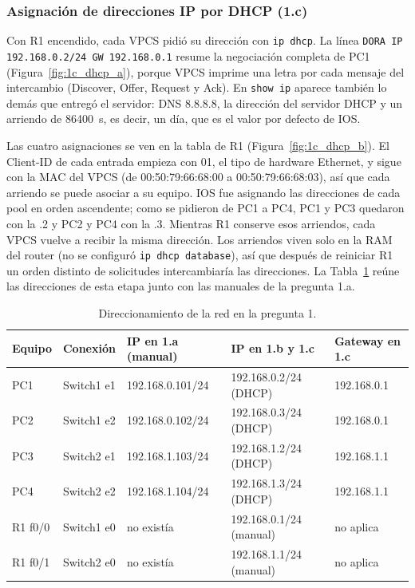 \documentclass[11pt]{article}
\begin{document}
\subsubsection{Asignación de direcciones IP por DHCP (1.c)}

Con R1 encendido, cada VPCS pidió su dirección con \texttt{ip dhcp}. La línea \texttt{DORA IP 192.168.0.2/24 GW 192.168.0.1} resume la negociación completa de PC1 (Figura~\ref{fig:1c_dhcp_a}), porque VPCS imprime una letra por cada mensaje del intercambio (Discover, Offer, Request y Ack). En \texttt{show ip} aparece también lo demás que entregó el servidor: DNS 8.8.8.8, la dirección del servidor DHCP y un arriendo de 86400~s, es decir, un día, que es el valor por defecto de IOS.

Las cuatro asignaciones se ven en la tabla de R1 (Figura~\ref{fig:1c_dhcp_b}). El Client-ID de cada entrada empieza con 01, el tipo de hardware Ethernet, y sigue con la MAC del VPCS (de 00:50:79:66:68:00 a 00:50:79:66:68:03), así que cada arriendo se puede asociar a su equipo. IOS fue asignando las direcciones de cada pool en orden ascendente; como se pidieron de PC1 a PC4, PC1 y PC3 quedaron con la .2 y PC2 y PC4 con la .3. Mientras R1 conserve esos arriendos, cada VPCS vuelve a recibir la misma dirección. Los arriendos viven solo en la RAM del router (no se configuró \texttt{ip dhcp database}), así que después de reiniciar R1 un orden distinto de solicitudes intercambiaría las direcciones. La Tabla~\ref{tab:direccionamiento} reúne las direcciones de esta etapa junto con las manuales de la pregunta 1.a.

\begin{table}[H]
\centering
\small
\caption{Direccionamiento de la red en la pregunta 1.}
\label{tab:direccionamiento}
\begin{tabular}{lllll}
\toprule
Equipo & Conexión & IP en 1.a (manual) & IP en 1.b y 1.c & Gateway en 1.c \\
\midrule
PC1    & Switch1 e1 & 192.168.0.101/24 & 192.168.0.2/24 (DHCP) & 192.168.0.1 \\
PC2    & Switch1 e2 & 192.168.0.102/24 & 192.168.0.3/24 (DHCP) & 192.168.0.1 \\
PC3    & Switch2 e1 & 192.168.1.103/24 & 192.168.1.2/24 (DHCP) & 192.168.1.1 \\
PC4    & Switch2 e2 & 192.168.1.104/24 & 192.168.1.3/24 (DHCP) & 192.168.1.1 \\
R1 f0/0 & Switch1 e0 & no existía      & 192.168.0.1/24 (manual) & no aplica \\
R1 f0/1 & Switch2 e0 & no existía      & 192.168.1.1/24 (manual) & no aplica \\
\bottomrule
\end{tabular}
\end{table}
\end{document}
